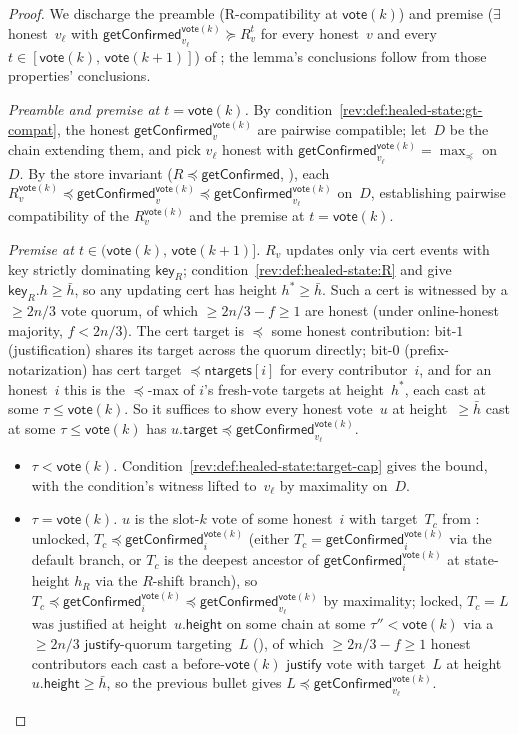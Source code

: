 \ifx\litemode\undefined\documentclass{article}\fi
\newcommand{\target}{\mathsf{target}}
\newcommand{\height}{\mathsf{height}}
\newcommand{\just}{\ensuremath{\mathsf{justify}}\xspace}
\newcommand{\ntargets}{\mathsf{ntargets}}
\newcommand{\key}{\mathsf{key}}
\newcommand{\vote}{\mathsf{vote}}
\newcommand{\comm}[1]{\bar{#1}}
\newcommand{\getConfirmed}{\textsf{getConfirmed}\xspace}
\theoremstyle{plain}
\theoremstyle{definition}
\theoremstyle{remark}
\newcommand{\OHM}{online-honest majority\xspace}
\begin{document}
\begin{proof}
We discharge the preamble (R-compatibility at $\vote(k)$) and premise ($\exists$ honest~$v_\ell$ with $\getConfirmed_{v_\ell}^{\vote(k)} \succeq R_v^t$ for every honest~$v$ and every $t \in [\vote(k),\, \vote(k+1)]$) of ; the lemma's conclusions follow from those properties' conclusions.

\emph{Preamble and premise at $t = \vote(k)$.}
By condition~\ref{rev:def:healed-state:gt-compat}, the honest $\getConfirmed_v^{\vote(k)}$ are pairwise compatible; let~$D$ be the chain extending them, and pick $v_\ell$ honest with $\getConfirmed_{v_\ell}^{\vote(k)} = \max_\preceq$ on~$D$. By the store invariant ($R \preceq \getConfirmed$, ), each $R_v^{\vote(k)} \preceq \getConfirmed_v^{\vote(k)} \preceq \getConfirmed_{v_\ell}^{\vote(k)}$ on~$D$, establishing pairwise compatibility of the $R_v^{\vote(k)}$ and the premise at $t = \vote(k)$.

\emph{Premise at $t \in (\vote(k),\, \vote(k+1)]$.}
$R_v$ updates only via cert events with key strictly dominating $\key_R$; condition~\ref{rev:def:healed-state:R} and  give $\key_R.h \geq \comm{h}$, so any updating cert has height $h^* \geq \comm{h}$. Such a cert is witnessed by a $\geq 2n/3$ vote quorum, of which $\geq 2n/3 - f \geq 1$ are honest (under \OHM, $f < 2n/3$). The cert target is $\preceq$ some honest contribution: bit-$1$ (justification) shares its target across the quorum directly; bit-$0$ (prefix-notarization) has cert target $\preceq \ntargets[i]$ for every contributor~$i$, and for an honest~$i$ this is the $\preceq$-max of $i$'s fresh-vote targets at height~$h^*$, each cast at some $\tau \leq \vote(k)$. So it suffices to show every honest vote~$u$ at height~$\geq \comm{h}$ cast at some $\tau \leq \vote(k)$ has $u.\target \preceq \getConfirmed_{v_\ell}^{\vote(k)}$.
\begin{itemize}
  \item \emph{$\tau < \vote(k)$.} Condition~\ref{rev:def:healed-state:target-cap} gives the bound, with the condition's witness lifted to~$v_\ell$ by maximality on~$D$.
  \item \emph{$\tau = \vote(k)$.} $u$ is the slot-$k$ vote of some honest~$i$ with target~$T_c$ from : unlocked, $T_c \preceq \getConfirmed_i^{\vote(k)}$ (either $T_c = \getConfirmed_i^{\vote(k)}$ via the default branch, or $T_c$ is the deepest ancestor of $\getConfirmed_i^{\vote(k)}$ at state-height $h_R$ via the $R$-shift branch), so $T_c \preceq \getConfirmed_i^{\vote(k)} \preceq \getConfirmed_{v_\ell}^{\vote(k)}$ by maximality; locked, $T_c = L$ was justified at height~$u.\height$ on some chain at some $\tau'' < \vote(k)$ via a $\geq 2n/3$ \just-quorum targeting~$L$ (), of which $\geq 2n/3 - f \geq 1$ honest contributors each cast a before-$\vote(k)$ \just vote with target~$L$ at height~$u.\height \geq \comm{h}$, so the previous bullet gives $L \preceq \getConfirmed_{v_\ell}^{\vote(k)}$.
\end{itemize}
\end{proof}
\end{document}
